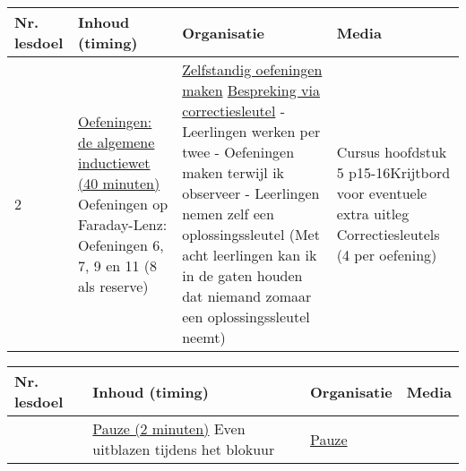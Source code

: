 \begin{landscape}
	\begin{tabularx}{1.56\textwidth}{|p{1.5cm}|p{6.5cm}|X|p{4cm}|}
		\hline
		\textbf{Nr. lesdoel } & \textbf{Inhoud (timing)}  & \textbf{Organisatie } & \textbf{Media } \\ \hline
		2\newline\newline3	&\underline{Oefeningen: de algemene} \underline{inductiewet (40 minuten)}\newline
			Oefeningen op Faraday-Lenz: Oefeningen 6, 7, 9 en 11 (8 als reserve)
		&  \underline{Zelfstandig oefeningen maken} \underline{Bespreking via correctiesleutel}\newline 
		- Leerlingen werken per twee\newline
			- Oefeningen maken terwijl ik observeer\newline
			- Leerlingen nemen zelf een oplossingssleutel (Met acht leerlingen kan ik in de gaten houden dat niemand zomaar een oplossingssleutel neemt)
		&   Cursus hoofdstuk 5 p15-16\newline\newline Krijtbord voor eventuele extra uitleg \newline\newline Correctiesleutels (4 per oefening)
		\\ \hline
	\end{tabularx}\vspace{5mm}


\begin{tabularx}{1.56\textwidth}{|p{1.5cm}|p{6.5cm}|X|p{3cm}|}
	\hline
	\textbf{Nr. lesdoel } & \textbf{Inhoud (timing)}  & \textbf{Organisatie } & \textbf{Media } \\ \hline
	& \underline{Pauze (2 minuten)}\newline
	Even uitblazen tijdens het blokuur
	&  \underline{Pauze}\newline 
	&  
	\\ \hline
\end{tabularx}\vspace{5mm}



\end{landscape}
